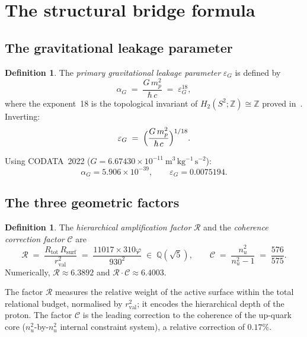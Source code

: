 \documentclass[11pt,a4paper]{article}
\theoremstyle{definition}
\newtheorem{definition}[theorem]{Definition}
\newcommand{\Rsurf}{R_{\mathrm{surf}}}
\newcommand{\Rtot}{R_{\mathrm{tot}}}
\newcommand{\rval}{r_{\mathrm{val}}}
\newcommand{\epsg}{\varepsilon_G}
\newcommand{\alphaG}{\alpha_G}
\newcommand{\calR}{\mathcal{R}}
\newcommand{\calC}{\mathcal{C}}
\newcommand{\vp}{\varphi}
\begin{document}
\section{The structural bridge formula}
\label{sec:bridge}

\subsection{The gravitational leakage parameter}
\label{subsec:epsG}

\begin{definition}
  \label{def:epsG}
  The \emph{primary gravitational leakage parameter} $\epsg$ is defined by
  \begin{equation}
    \label{eq:epsG_def}
    \alphaG \;=\; \frac{G\,m_p^2}{\hbar\,c} \;=\; \epsg^{18},
  \end{equation}
  where the exponent~18 is the topological invariant of
  $H_2(S^2;\mathbb{Z}) \cong \mathbb{Z}$ proved in~\cite{Topology_18_PDL_2026}.
  Inverting:
  \[
    \epsg \;=\; \Bigl(\frac{G\,m_p^2}{\hbar\,c}\Bigr)^{1/18}.
  \]
\end{definition}

Using CODATA~2022 ($G = 6.67430 \times 10^{-11}\ \mathrm{m^3\,kg^{-1}\,s^{-2}}$):
\[
  \alphaG = 5.906 \times 10^{-39}, \qquad \epsg = 0.0075194.
\]

\subsection{The three geometric factors}
\label{subsec:bridge_factors}

\begin{definition}
  \label{def:bridge_factors}
  The \emph{hierarchical amplification factor} $\calR$ and the
  \emph{coherence correction factor} $\calC$ are
  \begin{equation}
    \label{eq:R_and_C}
    \calR \;=\; \frac{\Rtot\,\Rsurf}{\rval^2}
          \;=\; \frac{11017 \times 310\vp}{930^2}
          \;\in\; \mathbb{Q}(\sqrt{5}),
    \qquad
    \calC \;=\; \frac{n_u^2}{n_u^2 - 1} \;=\; \frac{576}{575}.
  \end{equation}
  Numerically, $\calR \approx 6.3892$ and $\calR\cdot\calC \approx 6.4003$.
\end{definition}

The factor $\calR$ measures the relative weight of the active surface within the total relational budget, normalised by $\rval^2$; it encodes the hierarchical depth of the proton. The factor $\calC$ is the leading correction to the coherence of the up-quark core ($n_u^2$-by-$n_u^2$ internal constraint system), a relative correction of $0.17\%$.
\end{document}
